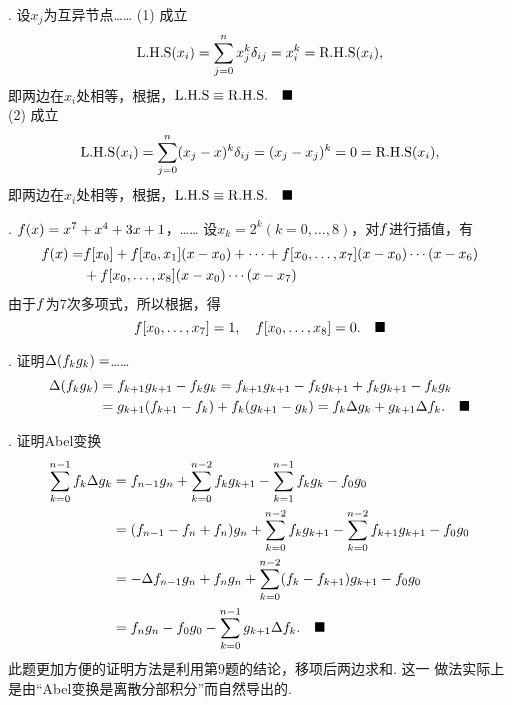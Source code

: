 \vspace{1cm}
. 设$x_j$为互异节点……
\ans
 (1) 成立$$\lhs(x_i)=\sum_{j=0}^nx_j^k\delta_{ij}=x_i^k=\rhs(x_i),$$
  即两边在$x_i$处相等，根据，$\lhs\equiv\rhs.\quad\blacksquare$\\
 (2) 成立
  \[
    \lhs(x_i) = \sum_{j=0}^n(x_j-x)^k\delta_{ij} = (x_j-x_j)^k = 0
    = \rhs(x_i),
  \]
  即两边在$x_i$处相等，根据，$\lhs\equiv\rhs.\quad\blacksquare$

\vspace{1cm}
\par{}. $\f(x) = x^7 + x^4 + 3x + 1$，……
\ans
  设$x_k = 2^k(k = 0,\dots,8)$，对$\f$进行插值，有
  \[\begin{split}
    \f(x) =& \f[x_0] + \f[x_0,x_1](x-x_0) + \cdots +
    \f[x_0,\dots,x_7](x-x_0)\cdots(x-x_6)\\
    &+ \f[x_0,\dots,x_8](x-x_0)\cdots(x-x_7)
  \end{split}\]
  由于$\f$为$7$次多项式，所以根据，得
  \[
    \f[x_0,\dots,x_7] = 1,\quad
    \f[x_0,\dots,x_8] = 0.\quad\blacksquare
  \]

\vspace{1cm}
\par{}. 证明$\Delta(\f_k\g_k)=$……
\ans
  \[\begin{split}
    \Delta(\f_k\g_k) &= \f_{k+1}\g_{k+1} - \f_k\g_k
    = \f_{k+1}\g_{k+1} - \f_k\g_{k+1} + \f_k\g_{k+1} - \f_k\g_k \\
    &= \g_{k+1}(\f_{k+1}-\f_k) + \f_k(\g_{k+1} - \g_k)
    = \f_k\Delta\g_k + \g_{k+1}\Delta\f_k.\quad\blacksquare
  \end{split}\]

\vspace{1cm}
\par{}. 证明Abel变换
\ans
  \[\begin{split}
    \sum_{k=0}^{n-1}\f_k\Delta\g_k &=
    \f_{n-1}\g_n + \sum_{k=0}^{n-2}\f_k\g_{k+1}
    - \sum_{k=1}^{n-1}\f_k\g_k - \f_0\g_0 \\
    &= (\f_{n-1}-\f_n+\f_n)\g_n + \sum_{k=0}^{n-2}\f_k\g_{k+1}
    - \sum_{k=0}^{n-2}\f_{k+1}\g_{k+1} - \f_0\g_0 \\
    &= -\Delta\f_{n-1}\g_n + \f_n\g_n +
    \sum_{k=0}^{n-2}(\f_k - \f_{k+1})\g_{k+1} - \f_0\g_0 \\
    &= \f_n\g_n - \f_0\g_0 - \sum_{k=0}^{n-1}\g_{k+1}\Delta\f_k.
    \quad\blacksquare
  \end{split}\]
\correct
  此题更加方便的证明方法是利用第9题的结论，移项后两边求和. 这一
  做法实际上是由“Abel变换是离散分部积分”而自然导出的.

